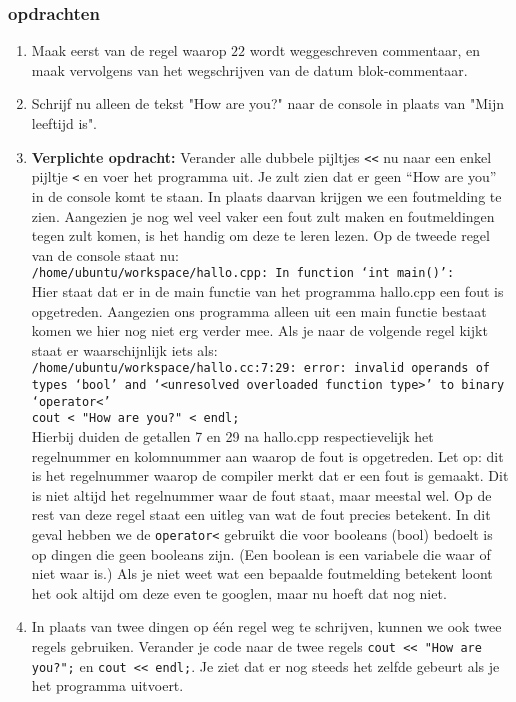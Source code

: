 \documentclass[12pt,a4paper]{article}
\newcommand{\icode}{\lstinline}
\newcommand{\mono}{\texttt}
\begin{document}
\subsubsection{opdrachten}
\begin{enumerate}
		\item
			Maak eerst van de regel waarop $22$ wordt weggeschreven commentaar, en maak vervolgens van het wegschrijven van de datum blok-commentaar.
		\item
			Schrijf nu alleen de tekst "How are you?" naar de console in plaats van "Mijn leeftijd is".
		\item 
			\textbf{Verplichte opdracht:} Verander alle dubbele pijltjes \icode{<<} nu naar een enkel pijltje \icode{<} en voer het programma uit. Je zult zien dat er geen ``How are you'' in de console komt te staan. In plaats daarvan krijgen we een foutmelding te zien. Aangezien je nog wel veel vaker een fout zult maken en foutmeldingen tegen zult komen, is het handig om deze te leren lezen. Op de tweede regel van de console staat nu:\\
\mono{/home/ubuntu/workspace/hallo.cpp: In function ‘int main()’:}\\
Hier staat dat er in de main functie van het programma hallo.cpp een fout is opgetreden. Aangezien ons programma alleen uit een main functie bestaat komen we hier nog niet erg verder mee. Als je naar de volgende regel kijkt staat er waarschijnlijk iets als:\\
\mono{/home/ubuntu/workspace/hallo.cc:7:29: error: invalid operands of types ‘bool’ and ‘<unresolved overloaded function type>’ to binary ‘operator<'\\
cout < "How are you?" < endl;}\\
Hierbij duiden de getallen 7 en 29 na hallo.cpp respectievelijk het regelnummer en kolomnummer aan waarop de fout is opgetreden. Let op: dit is het regelnummer waarop de compiler merkt dat er een fout is gemaakt. Dit is niet altijd het regelnummer waar de fout staat, maar meestal wel. Op de rest van deze regel staat een uitleg van wat de fout precies betekent. In dit geval hebben we de \mono{operator<} gebruikt die voor booleans (bool) bedoelt is op dingen die geen booleans zijn. (Een boolean is een variabele die waar of niet waar is.) Als je niet weet wat een bepaalde foutmelding betekent loont het ook altijd om deze even te googlen, maar nu hoeft dat nog niet.
		\item
			In plaats van twee dingen op \'e\'en regel weg te schrijven, kunnen we ook twee regels gebruiken. Verander je code naar de twee regels \icode{cout << "How are you?";} en \icode{cout << endl;}. Je ziet dat er nog steeds het zelfde gebeurt als je het programma uitvoert.

\end{enumerate}
\end{document}
